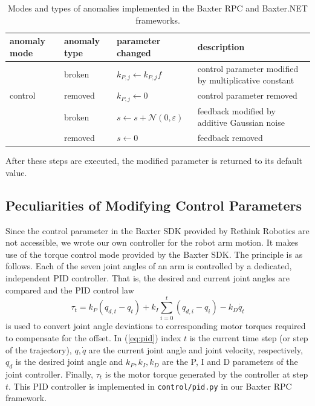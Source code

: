 \documentclass{scrartcl}
\newcommand{\baxterdotnet}{Baxter.NET\xspace}
\newcommand{\baxterrpc}{Baxter RPC\xspace}
\begin{document}
            \begin{table}
                \centering
                \caption{Modes and types of anomalies implemented in the \baxterrpc and \baxterdotnet frameworks.}
                \label{tab:types}
                \begin{tabular}{lllp{5cm}}
                    \toprule
                    anomaly mode & anomaly type & parameter changed & description \\
                    \midrule
                    \multirow{3}{*}{control} & broken & $k_{P,j} \leftarrow k_{P,j}f$ & control parameter modified by multiplicative constant \\
                    & removed & $k_{P,j} \leftarrow 0$ & control parameter removed \\
                    \midrule
                    \multirow{3}{*}{feedback} & broken & $s \leftarrow s + \mathcal{N}(0, \varepsilon)$ & feedback modified by additive Gaussian noise \\
                     & removed & $s \leftarrow 0$ & feedback removed \\
                    \bottomrule
                \end{tabular}
            \end{table}
            After these steps are executed, the modified parameter is returned to its default value.

    \subsection{Peculiarities of Modifying Control Parameters}
        Since the control parameter in the Baxter SDK provided by Rethink Robotics are not accessible, we wrote our own controller for the robot arm motion.
        It makes use of the torque control mode provided by the Baxter SDK.
        The principle is as follows.
        Each of the seven joint angles of an arm is controlled by a dedicated, independent PID controller.
        That is, the desired and current joint angles are compared and the PID control law 
        \begin{equation}
        \label{eq:pid}
            \tau_t = k_P(q_{d,t} - q_t) + k_I\sum_{i=0}^t(q_{d,i} - q_i) - k_D\dot{q_t}
        \end{equation}
        is used to convert joint angle deviations to corresponding motor torques required to compensate for the offset.
        In (\ref{eq:pid}) index $t$ is the current time step (or step of the trajectory), $q, \dot{q}$ are the current joint angle and joint velocity, respectively, $q_d$ is the desired joint angle and $k_P, k_I, k_D$ are the P, I and D parameters of the joint controller.
        Finally, $\tau_t$ is the motor torque generated by the controller at step $t$.
        This PID controller is implemented in \verb|control/pid.py| in our \baxterrpc framework.
        
\end{document}

